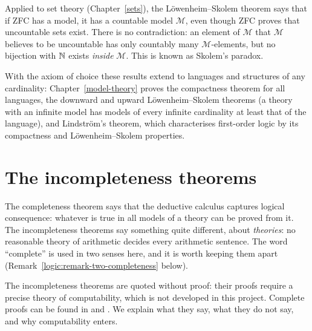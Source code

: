 \begin{remark}\label{logic:remark-skolem-paradox}
Applied to set theory (Chapter~\ref{sets}), the L\"owenheim--Skolem theorem
says that if ZFC has a model, it has a countable model $\mathcal{M}$, even
though ZFC proves that uncountable sets exist. There is no contradiction: an
element of $\mathcal{M}$ that $\mathcal{M}$ believes to be uncountable has
only countably many $\mathcal{M}$-elements, but no bijection with $\mathbb{N}$ exists
\emph{inside} $\mathcal{M}$. This is known as Skolem's paradox.
\end{remark}

\begin{remark}\label{logic:remark-model-theory}
With the axiom of choice these results extend to languages and structures of any cardinality: Chapter~\ref{model-theory}
proves the compactness theorem for all languages, the downward and upward L\"owenheim--Skolem theorems (a theory with an
infinite model has models of every infinite cardinality at least that of the language), and Lindstr\"om's theorem, which
characterises first-order logic by its compactness and L\"owenheim--Skolem properties.
\end{remark}

\section{The incompleteness theorems}\label{logic:section-incompleteness}

The completeness theorem says that the deductive calculus captures logical consequence: whatever is true in all models of a theory can be proved from it. The
incompleteness theorems say something quite different, about \emph{theories}: no reasonable theory of arithmetic decides every arithmetic sentence. The word ``complete'' is
used in two senses here, and it is worth keeping them apart (Remark~\ref{logic:remark-two-completeness} below).

The incompleteness theorems are quoted without proof: their proofs require a precise theory of computability, which is not developed in this project. Complete proofs can be
found in \cite{smith-godel} and \cite[Chapter 6]{shoenfield-logic}. We explain what they say, what they do not say, and why computability enters.

